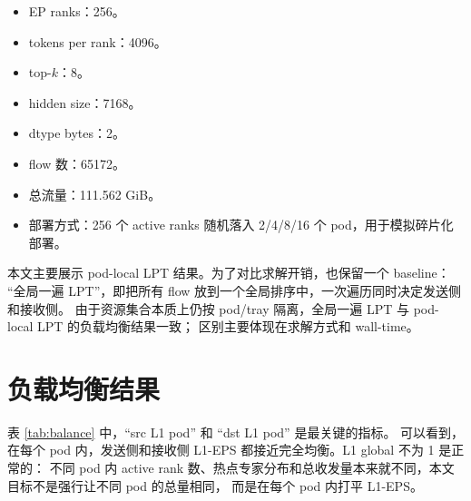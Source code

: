 \documentclass[UTF8,a4paper,11pt,fontset=none]{ctexart}
\begin{document}
\begin{itemize}
  \item EP ranks：256。
  \item tokens per rank：4096。
  \item top-$k$：8。
  \item hidden size：7168。
  \item dtype bytes：2。
  \item flow 数：65172。
  \item 总流量：111.562 GiB。
  \item 部署方式：256 个 active ranks 随机落入 2/4/8/16 个 pod，用于模拟碎片化部署。
\end{itemize}

本文主要展示 pod-local LPT 结果。为了对比求解开销，也保留一个 baseline：
``全局一遍 LPT''，即把所有 flow 放到一个全局排序中，一次遍历同时决定发送侧和接收侧。
由于资源集合本质上仍按 pod/tray 隔离，全局一遍 LPT 与 pod-local LPT 的负载均衡结果一致；
区别主要体现在求解方式和 wall-time。

\section{负载均衡结果}

\begin{table}[H]
\centering
\caption{Pod-local LPT 后的发送/接收负载均衡结果，数值为 max/mean}
\label{tab:balance}
\end{table}

表 \ref{tab:balance} 中，``src L1 pod'' 和 ``dst L1 pod'' 是最关键的指标。
可以看到，在每个 pod 内，发送侧和接收侧 L1-EPS 都接近完全均衡。L1 global 不为 1 是正常的：
不同 pod 内 active rank 数、热点专家分布和总收发量本来就不同，本文目标不是强行让不同 pod 的总量相同，
而是在每个 pod 内打平 L1-EPS。
\end{document}
